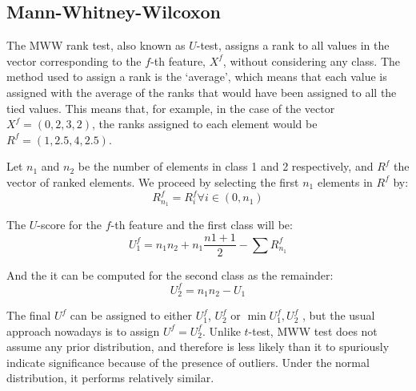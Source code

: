 

\subsection{Mann-Whitney-Wilcoxon} 
The \acf{MWW} rank test, also known as $U$-test, assigns a rank to all values in the vector corresponding to the $f$-th feature, $X^f$, without considering any class. The method used to assign a rank is the `average', which means that each value is assigned with the average of the ranks that would have been assigned to all the tied values. This means that, for example, in the case of the vector $X^f=(0,2,3,2)$, the ranks assigned to each element would be $R^f=(1,2.5,4,2.5)$. 

Let $n_1$ and $n_2$ be the number of elements in class 1 and 2 respectively, and $R^f$ the vector of ranked elements. We proceed by selecting the first $n_1$ elements in $R^f$ by: 
\begin{equation}
	R^f_{n_1} = {R^f_i} \forall i\in(0,n_1)
\end{equation}

The $U$-score for the $f$-th feature and the first class will be: 
\begin{equation}
	U_1^f = n_1 n_2 + n_1 \frac{n1+1}{2} - \sum R^f_{n_1}
\end{equation}

And the it can be computed for the second class as the remainder: 
\begin{equation}
	U_2^f = n_1 n_2 - U_1
\end{equation}

The final $U^f$ can be assigned to either $U_1^f$, $U_2^f$ or $\min{U_1^f,U_2^f}$ \cite{Fay10}, but the usual approach nowadays is to assign $U^f=U_2^f$. Unlike $t$-test, \ac{MWW} test does not assume any prior distribution, and therefore is less likely than it to spuriously indicate significance because of the presence of outliers. Under the normal distribution, it performs relatively similar. 

